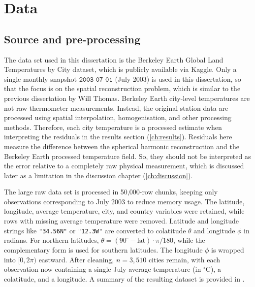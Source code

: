 \chapter{Data}
\label{ch:data}

\section{Source and pre-processing}

The data set used in this dissertation is the Berkeley Earth Global Land Temperatures by City dataset, which is publicly available via Kaggle. Only a single monthly snapshot $\texttt{2003-07-01}$ (July 2003) is used in this dissertation, so that the focus is on the spatial reconstruction problem, which is similar to the previous dissertation by Will Thomas. Berkeley Earth city-level temperatures are not raw thermometer measurements. Instead, the original station data are processed using spatial interpolation, homogenisation, and other processing methods. Therefore, each city temperature is a processed estimate when interpreting the residuals in the results section (\cref{ch:results}). Residuals here measure the difference between the spherical harmonic reconstruction and the Berkeley Earth processed temperature field. So, they should not be interpreted as the error relative to a completely raw physical measurement, which is discussed later as a limitation in the discussion chapter (\cref{ch:discussion}).

The large raw data set is processed in 50,000-row chunks, keeping only observations corresponding to July 2003 to reduce memory usage. The latitude, longitude, average temperature, city, and country variables were retained, while rows with missing average temperature were removed. Latitude and longitude strings like \texttt{"34.56N"} or \texttt{"12.3W"} are converted to colatitude $\theta$ and longitude $\phi$ in radians. For northern latitudes, $\theta = (90^\circ - \mathrm{lat})\cdot\pi/180$, while the complementary form is used for southern latitudes. The longitude $\phi$ is wrapped into $[0,2\pi)$ eastward. After cleaning, $n=3,510$ cities remain, with each observation now containing a single July average temperature (in $^\circ\mathrm{C}$), a colatitude, and a longitude. A summary of the resulting dataset is provided in . 

